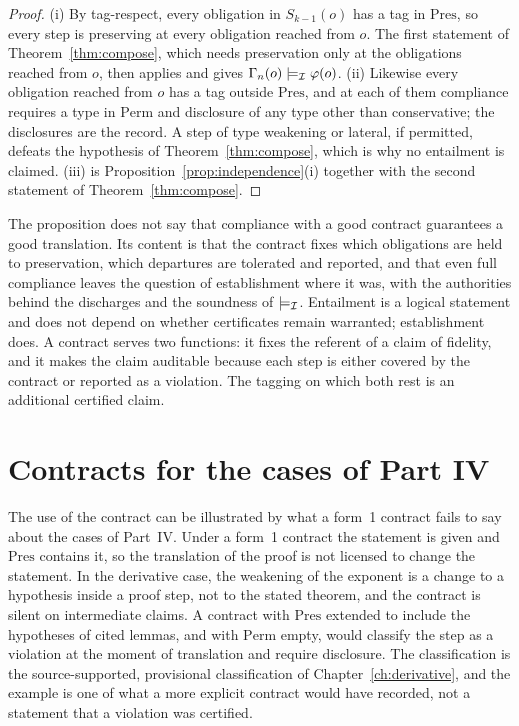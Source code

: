 \begin{proof}
(i) By tag-respect, every obligation in $S_{k-1}(o)$ has a tag in $\mathrm{Pres}$, so every step is preserving at every obligation reached from $o$. The first statement of Theorem~\ref{thm:compose}, which needs preservation only at the obligations reached from $o$, then applies and gives $\Gamma_n(o)\models_{\mathcal{I}}\varphi(o)$. (ii) Likewise every obligation reached from $o$ has a tag outside $\mathrm{Pres}$, and at each of them compliance requires a type in $\mathrm{Perm}$ and disclosure of any type other than conservative; the disclosures are the record. A step of type weakening or lateral, if permitted, defeats the hypothesis of Theorem~\ref{thm:compose}, which is why no entailment is claimed. (iii) is Proposition~\ref{prop:independence}(i) together with the second statement of Theorem~\ref{thm:compose}.
\end{proof}

The proposition does not say that compliance with a good contract guarantees a good translation. Its content is that the contract fixes which obligations are held to preservation, which departures are tolerated and reported, and that even full compliance leaves the question of establishment where it was, with the authorities behind the discharges and the soundness of $\models_{\mathcal{I}}$. Entailment is a logical statement and does not depend on whether certificates remain warranted; establishment does. A contract serves two functions: it fixes the referent of a claim of fidelity, and it makes the claim auditable because each step is either covered by the contract or reported as a violation. The tagging on which both rest is an additional certified claim.

\section{Contracts for the cases of Part IV}

The use of the contract can be illustrated by what a form~1 contract fails to say about the cases of Part~IV. Under a form~1 contract the statement is given and $\mathrm{Pres}$ contains it, so the translation of the proof is not licensed to change the statement. In the derivative case, the weakening of the exponent is a change to a hypothesis inside a proof step, not to the stated theorem, and the contract is silent on intermediate claims. A contract with $\mathrm{Pres}$ extended to include the hypotheses of cited lemmas, and with $\mathrm{Perm}$ empty, would classify the step as a violation at the moment of translation and require disclosure. The classification is the source-supported, provisional classification of Chapter~\ref{ch:derivative}, and the example is one of what a more explicit contract would have recorded, not a statement that a violation was certified.

